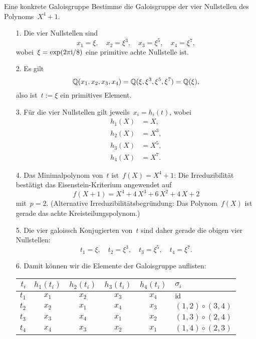\documentclass{algblatt}
\begin{document}
\begin{aufgabe}{Eine konkrete Galoisgruppe}
Bestimme die Galoisgruppe der vier Nullstellen des Polynoms~$X^4 + 1$.

\begin{loesung}
\begin{enumerate}
\item[1.] Die vier Nullstellen sind
\[ x_1 = \xi,\quad
  x_2 = \xi^3,\quad
  x_3 = \xi^5,\quad
  x_4 = \xi^7, \]
wobei~$\xi = \exp(2\pi\mathrm{i}/8)$ eine primitive achte Nullstelle ist.

\item[2.] Es gilt
\[ \mathbb{Q}(x_1,x_2,x_3,x_4) = \mathbb{Q}(\xi,\xi^3,\xi^5,\xi^7) = \mathbb{Q}(\xi), \]
also ist~$t := \xi$ ein primitives Element.

\item[3.] Für die vier Nullstellen gilt jeweils~$x_i = h_i(t)$, wobei
\begin{align*}
  h_1(X) &= X, \\
  h_2(X) &= X^3, \\
  h_3(X) &= X^5, \\
  h_4(X) &= X^7.
\end{align*}

\item[4.] Das Minimalpolynom von~$t$ ist~$f(X) = X^4 + 1$: Die Irreduzibilität
bestätigt das Eisenstein-Kriterium angewendet auf
\[ f(X+1) = X^4 + 4 \,X^3 + 6\,X^2 + 4\,X + 2 \]
mit~$p = 2$. (Alternative Irreduzibilitätsbegründung: Das Polynom~$f(X)$ ist gerade
das achte Kreisteilungspolynom.)

\item[5.] Die vier galoissch Konjugierten von~$t$ sind daher gerade die obigen
vier Nullstellen:
\[ t_1 = \xi,\quad
  t_2 = \xi^3,\quad
  t_3 = \xi^5,\quad
  t_4 = \xi^7. \]

\item[6.] Damit können wir die Elemente der Galoisgruppe auflisten:
\begin{center}
  \begin{tabular}{@{}r|cccc|l@{}}
    $t_i$ & $h_1(t_i)$ & $h_2(t_i)$ & $h_3(t_i)$ & $h_4(t_i)$ & $\sigma_i$ \\\hline
    $t_1$ & $x_1$ & $x_2$ & $x_3$ & $x_4$ & $\mathrm{id}$ \\
    $t_2$ & $x_2$ & $x_1$ & $x_4$ & $x_3$ & $(1,2) \circ (3,4)$ \\
    $t_3$ & $x_3$ & $x_4$ & $x_1$ & $x_2$ & $(1,3) \circ (2,4)$ \\
    $t_4$ & $x_4$ & $x_3$ & $x_2$ & $x_1$ & $(1,4) \circ (2,3)$
  \end{tabular}
\end{center}
\end{enumerate}
\end{loesung}
\end{aufgabe}
\end{document}
